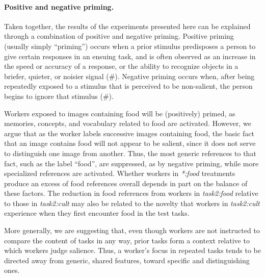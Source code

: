 \documentclass[12pt]{article}
\begin{document}
\paragraph{Positive and negative priming.}
Taken together, the results of the experiments presented here can be 
explained through a combination of positive and negative priming.
Positive priming (usually simply ``priming'') occurs when a prior stimulus 
predisposes a person to give certain responses in an ensuing task, and
is often observed as an increase in the speed or accuracy of a response, or
the ability to recognize objects in a briefer, quieter, or noisier signal (\#).
Negative priming occurs when, after being repeatedly exposed to a stimulus 
that is perceived to be non-salient, the person begins to ignore that 
stimulus (\#).  

Workers exposed to images containing food will be (positively) primed, 
as memories, concepts, and vocabulary related to food are activated.  
However, we argue that as the worker labels successive images containing food,
the basic 
fact that an image contains food will not appear to be salient, since it 
does not serve to distinguish one image from another.  Thus, the most 
generic references to that fact, such as the label ``food'', 
are suppressed, as by negative priming, while more specialized
references are activated.  Whether workers in \textit{*:food} treatments
produce an excess of food references overall depends in part on the balance 
of these factors.  The reduction in food references from workers in 
\textit{task2:food} relative
to those in \textit{task2:cult} may also be related to the novelty that 
workers in 
\textit{task2:cult} experience when they first encounter food in the test 
tasks.

More generally, we are suggesting that, even though workers are not 
instructed to compare the content of tasks in any way, prior tasks form a 
context relative to which workers judge salience.  Thus, a worker's focus 
in repeated tasks tends to be directed away from generic, shared features, 
toward specific and distinguishing ones.
\end{document}
